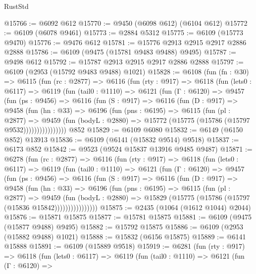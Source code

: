 \begin{lexlean}{RustStd}
\begin{coremodule}
@15766 := @6092 @612
@15770 := @9450 (@6098 @612) (@6104 @612)
@15772 := @6109 (@6078 @9461)
@15773 := @2884 @5312
@15775 := @6109 (@15773 @9470)
@15776 := @9476 @612
@15781 := @15776 @2913 @2915 @2917 @2886 @2888
@15786 := @6109 (@9475 (@15781 @9483 @9488) @9495)
@15787 := @9498 @612
@15792 := @15787 @2913 @2915 @2917 @2886 @2888
@15797 := @6109 (@2953 (@15792 @9483 @9488) @1021)
@15828 := @6108
    (fun (fn : @30) =>
    @6115
      (fun (rc : @2877) =>
      @6116
        (fun (rty : @917) =>
        @6118
          (fun (lets0 : @6117) =>
          @6119
            (fun (tail0 : @1110) =>
            @6121
              (fun (Γ : @6120) =>
              @9457
                (fun (ps : @9456) =>
                @6116
                  (fun (S : @917) =>
                  @6116
                    (fun (D : @917) =>
                    @9458
                      (fun (hn : @33) =>
                      @6196
                        (fun (pns : @6195) =>
                        @6115
                          (fun (pl : @2877) =>
                          @9459
                            (fun (bodyL : @2880) =>
                            @15772 (@15775 (@15786 (@15797 @9532))))))))))))))))
    @852
@15829 := @6109 @6080
@15832 := @6149 (@6150 @852) @13913
@15836 := @6109 (@6141 (@15832 @9514) @9518)
@15837 := @6173 @852
@15842 := @9523 (@9524 @15837 @13916 @9485 @9487)
@15871 := @6278
    (fun (rc : @2877) =>
    @6116
      (fun (rty : @917) =>
      @6118
        (fun (lets0 : @6117) =>
        @6119
          (fun (tail0 : @1110) =>
          @6121
            (fun (Γ : @6120) =>
            @9457
              (fun (ps : @9456) =>
              @6116
                (fun (S : @917) =>
                @6116
                  (fun (D : @917) =>
                  @9458
                    (fun (hn : @33) =>
                    @6196
                      (fun (pns : @6195) =>
                      @6115
                        (fun (pl : @2877) =>
                        @9459
                          (fun (bodyL : @2880) =>
                          @15829 (@15775 (@15786 (@15797 (@15836 @15842))))))))))))))))
@15875 := @2435 (@1064 (@1612 @1044) @2044)
@15876 := @15871 @15875
@15877 := @15781 @15875
@15881 := @6109 (@9475 (@15877 @9488) @9495)
@15882 := @15792 @15875
@15886 := @6109 (@2953 (@15882 @9488) @1021)
@15888 := @15832 (@6156 @15875)
@15889 := @6141 @15888
@15891 := @6109 (@15889 @9518)
@15919 := @6281
    (fun (rty : @917) =>
    @6118
      (fun (lets0 : @6117) =>
      @6119
        (fun (tail0 : @1110) =>
        @6121
          (fun (Γ : @6120) =>

\end{coremodule}
\end{lexlean}
